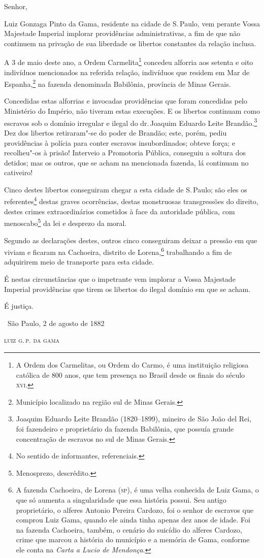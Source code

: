\noindent{}Senhor,\smallskip

Luiz Gonzaga Pinto da Gama, residente na cidade de S.\,Paulo, vem perante
Vossa Majestade Imperial implorar providências administrativas, a fim de
que não continuem na privação de sua liberdade os libertos constantes da
relação inclusa.

A 3 de maio deste ano, a Ordem Carmelita\footnote{A Ordem dos
  Carmelitas, ou Ordem do Carmo, é uma instituição religiosa católica de
  800 anos, que tem presença no Brasil desde os finais do século \textsc{xvi}.}
concedeu alforria aos setenta e oito indivíduos mencionados na referida
relação, indivíduos que residem em Mar de Espanha,\footnote{Município
  localizado na região sul de Minas Gerais.} na fazenda denominada
Babilônia, província de Minas Gerais.

Concedidas estas alforrias e invocadas providências que foram concedidas
pelo Ministério do Império, não tiveram estas execuções. E os libertos
continuam como escravos sob o domínio irregular e ilegal do dr.\,Joaquim
Eduardo Leite Brandão.\footnote{Joaquim Eduardo Leite Brandão
  (1820--1899), mineiro de São João del Rei, foi fazendeiro e
  proprietário da fazenda Babilônia, que possuía grande concentração de
  escravos no sul de Minas Gerais.} Dez dos libertos retiraram"-se do
poder de Brandão; este, porém, pediu providências à polícia para conter
escravos insubordinados; obteve força; e recolheu"-os à prisão! Interveio
a Promotoria Pública, conseguiu a soltura dos detidos; mas os outros,
que se acham na mencionada fazenda, lá continuam no cativeiro!

Cinco destes libertos conseguiram chegar a esta cidade de S.\,Paulo; são
eles os referentes\footnote{No sentido de informantes, referenciais.}
destas graves ocorrências, destas monstruosas transgressões do direito,
destes crimes extraordinários cometidos à face da autoridade pública,
com menoscabo\footnote{Menosprezo, descrédito.} da lei e desprezo da
moral.

Segundo as declarações destes, outros cinco conseguiram deixar a pressão
em que viviam e ficaram na Cachoeira, distrito de Lorena,\footnote{A
  fazenda Cachoeira, de Lorena (\textsc{sp}), é uma velha conhecida de Luiz Gama,
  o que só aumenta a singularidade que essa história possui. Seu antigo
  proprietário, o alferes Antonio Pereira Cardozo, foi o senhor de
  escravos que comprou Luiz Gama, quando ele ainda tinha apenas dez anos
  de idade. Foi na fazenda Cachoeira, também, o cenário do suicídio do
  alferes Cardozo, crime que marcou a história do município e a memória
  de Gama, conforme ele conta na \emph{Carta a Lucio de Mendonça}.}
trabalhando a fim de
adquirirem meio de transporte para esta cidade.

É nestas circunstâncias que o impetrante vem implorar a Vossa Majestade
Imperial providências que tirem os libertos do ilegal domínio em que se
acham.

É justiça.

\bigskip

\hfill\ São Paulo, 2 de agosto de 1882\smallskip

\hfill\textsc{luiz g.\,p. da gama}

